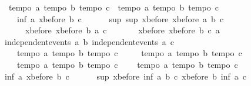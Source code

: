 \begin{isabellebody}
\ \ {\isasymlbrakk}tempo{}\ a{\isacharsemicolon}\ tempo{}\ b{\isacharsemicolon}\ tempo{}\ c{\isasymrbrakk}\ {\isasymLongrightarrow}\ {\isasymlbrakk}tempo{}\ a{\isacharsemicolon}\ tempo{}\ b{\isacharsemicolon}\ tempo{}\ c{\isasymrbrakk}\ {\isasymLongrightarrow}\ \isanewline
\ \ \ \ inf\ a\ {\isacharparenleft}xbefore\ b\ c{\isacharparenright}\ {\isacharequal}\ \isanewline
\ \ \ \ sup\ {\isacharparenleft}sup\ {\isacharparenleft}xbefore\ {\isacharparenleft}xbefore\ a\ b{\isacharparenright}\ c{\isacharparenright}\ \isanewline
\ \ \ \ \ \ {\isacharparenleft}xbefore\ {\isacharparenleft}xbefore\ b\ a{\isacharparenright}\ c{\isacharparenright}{\isacharparenright}\ \isanewline
\ \ \ \ \ \ {\isacharparenleft}xbefore\ {\isacharparenleft}xbefore\ b\ c{\isacharparenright}\ a{\isacharparenright}{\isachardoublequoteclose}\isanewline
%
\isadelimproof
%
\endisadelimproof
%
\isatagproof
{}\isamarkupfalse%
{\isacharminus}\isanewline
\ \ \isamarkupfalse%
\ {\isachardoublequoteopen}independent{\isacharunderscore}events\ a\ b{\isachardoublequoteclose}\ {\isachardoublequoteopen}independent{\isacharunderscore}events\ a\ c{\isachardoublequoteclose}\ \isanewline
\ \ \ \ {\isachardoublequoteopen}tempo{}\ a{\isachardoublequoteclose}\ {\isachardoublequoteopen}tempo{}\ b{\isachardoublequoteclose}\ {\isachardoublequoteopen}tempo{}\ c{\isachardoublequoteclose}\ \isanewline
\ \ \ \ {\isachardoublequoteopen}tempo{}\ a{\isachardoublequoteclose}\ {\isachardoublequoteopen}tempo{}\ b{\isachardoublequoteclose}\ {\isachardoublequoteopen}tempo{}\ c{\isachardoublequoteclose}\ \isanewline
\ \ \ \ {\isachardoublequoteopen}tempo{}\ a{\isachardoublequoteclose}\ {\isachardoublequoteopen}tempo{}\ b{\isachardoublequoteclose}\ {\isachardoublequoteopen}tempo{}\ c{\isachardoublequoteclose}\isanewline
\ \ \ \ {\isachardoublequoteopen}tempo{}\ a{\isachardoublequoteclose}\ {\isachardoublequoteopen}tempo{}\ b{\isachardoublequoteclose}\ {\isachardoublequoteopen}tempo{}\ c{\isachardoublequoteclose}\isanewline
\ \ \isamarkupfalse%
\ {\isachardoublequoteopen}inf\ a\ {\isacharparenleft}xbefore\ b\ c{\isacharparenright}\ {\isacharequal}\ \isanewline
\ \ \ \ sup\ {\isacharparenleft}xbefore\ {\isacharparenleft}inf\ a\ b{\isacharparenright}\ c{\isacharparenright}\ {\isacharparenleft}xbefore\ b\ {\isacharparenleft}inf\ a\ c{\isacharparenright}{\isacharparenright}{\isachardoublequoteclose}\isanewline

\end{isabellebody}
